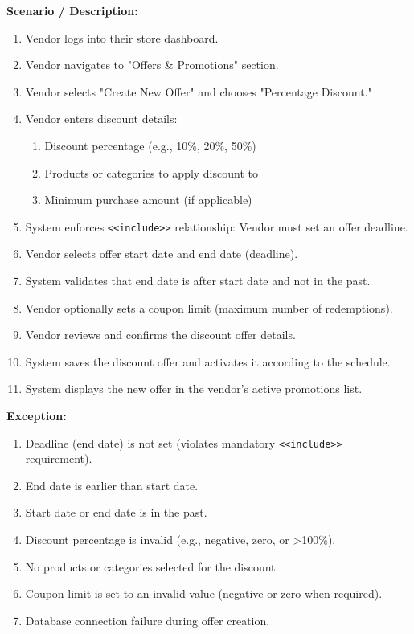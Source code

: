 \textbf{Scenario / Description:}
\begin{enumerate}
    \item Vendor logs into their store dashboard.
    \item Vendor navigates to "Offers \& Promotions" section.
    \item Vendor selects "Create New Offer" and chooses "Percentage Discount."
    \item Vendor enters discount details:
    \begin{enumerate}
        \item Discount percentage (e.g., 10\%, 20\%, 50\%)
        \item Products or categories to apply discount to
        \item Minimum purchase amount (if applicable)
    \end{enumerate}
    \item System enforces \texttt{\textless\textless include\textgreater\textgreater} relationship: Vendor must set an offer deadline.
    \item Vendor selects offer start date and end date (deadline).
    \item System validates that end date is after start date and not in the past.
    \item Vendor optionally sets a coupon limit (maximum number of redemptions).
    \item Vendor reviews and confirms the discount offer details.
    \item System saves the discount offer and activates it according to the schedule.
    \item System displays the new offer in the vendor's active promotions list.
\end{enumerate}

\textbf{Exception:}
\begin{enumerate}
    \item Deadline (end date) is not set (violates mandatory \texttt{\textless\textless include\textgreater\textgreater} requirement).
    \item End date is earlier than start date.
    \item Start date or end date is in the past.
    \item Discount percentage is invalid (e.g., negative, zero, or >100\%).
    \item No products or categories selected for the discount.
    \item Coupon limit is set to an invalid value (negative or zero when required).
    \item Database connection failure during offer creation.
\end{enumerate}

